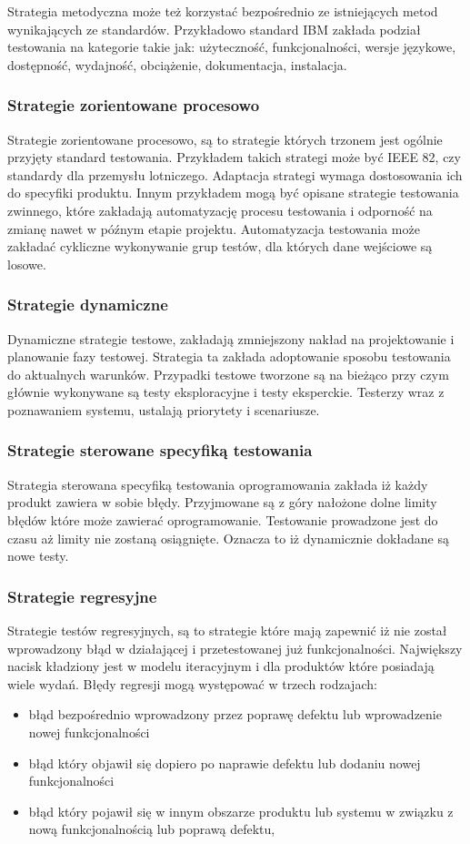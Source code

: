 Strategia metodyczna może też korzystać bezpośrednio ze istniejących metod wynikających ze standardów. Przykładowo standard IBM zakłada podział testowania na kategorie takie jak: użyteczność, funkcjonalności, wersje językowe, dostępność, wydajność, obciążenie, dokumentacja, instalacja.
\subsubsection{Strategie zorientowane procesowo}
Strategie zorientowane procesowo, są to strategie których trzonem jest ogólnie przyjęty standard testowania. Przykładem takich strategi może być IEEE 82, czy standardy dla przemysłu lotniczego. Adaptacja strategi wymaga dostosowania ich do specyfiki produktu. Innym przykładem mogą być opisane strategie testowania zwinnego, które zakładają automatyzację procesu testowania i odporność na zmianę nawet w późnym etapie projektu. Automatyzacja testowania może zakładać cykliczne wykonywanie grup testów, dla których dane wejściowe są losowe.
\subsubsection{Strategie dynamiczne}
Dynamiczne strategie testowe, zakładają zmniejszony nakład na projektowanie i planowanie fazy testowej. Strategia ta zakłada adoptowanie sposobu testowania do aktualnych warunków. Przypadki testowe tworzone są na bieżąco przy czym głównie wykonywane są testy eksploracyjne i testy eksperckie. Testerzy wraz z poznawaniem systemu, ustalają priorytety i scenariusze.
\subsubsection{Strategie sterowane specyfiką testowania}
Strategia sterowana specyfiką testowania oprogramowania zakłada iż każdy produkt zawiera w sobie błędy. Przyjmowane są z góry nałożone dolne limity błędów które może zawierać oprogramowanie. Testowanie prowadzone jest do czasu aż limity nie zostaną osiągnięte. Oznacza to iż dynamicznie dokładane są nowe testy.
\subsubsection{Strategie regresyjne}
Strategie testów regresyjnych, są to strategie które mają zapewnić iż nie został wprowadzony błąd w działającej i przetestowanej już funkcjonalności. Największy nacisk kładziony jest w modelu iteracyjnym i dla produktów które posiadają wiele wydań. Błędy regresji mogą występować w trzech rodzajach:
\begin{itemize}
  \item błąd bezpośrednio wprowadzony przez poprawę defektu lub wprowadzenie nowej funkcjonalności
  \item błąd który objawił się dopiero po naprawie defektu lub dodaniu nowej funkcjonalności
  \item  błąd który pojawił się w innym obszarze produktu lub systemu w związku z nową funkcjonalnością lub poprawą defektu,
\end{itemize}


